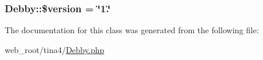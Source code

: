\subsubsection[{\$version}]{\setlength{\rightskip}{0pt plus 5cm}Debby\+::\$version = \char`\"{}1.\char`\"{}}\label{classDebby_a378b706b515617c9019b313136e4678c}


The documentation for this class was generated from the following file\+:\begin{DoxyCompactItemize}
\item 
web\+\_\+root/tina4/\hyperlink{Debby_8php}{Debby.\+php}\end{DoxyCompactItemize}
